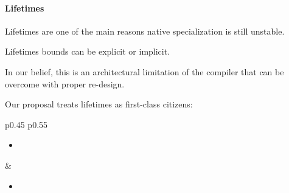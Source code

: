
\begin{frame}{\secname}
	\framesubtitle{Lifetimes}

	Lifetimes %
	are one of the main reasons native specialization is still unstable. %

	\bigskip

	Lifetimes bounds can be explicit or implicit. %

	\bigskip

	In our belief, this is an \alert{architectural limitation} of the compiler that can be overcome with proper re-design.

	\bigskip

	Our proposal treats lifetimes as first-class citizens:

	\begin{tabular}{p{} p{}}
		\begin{itemize}
			\item {} %
		\end{itemize}
		 &
		\begin{itemize}
			\item {} %
		\end{itemize}
	\end{tabular}

\end{frame}



